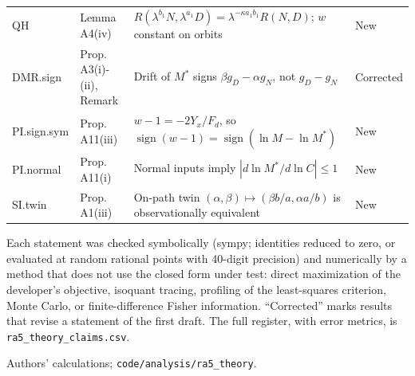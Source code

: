 \begin{table}[tp]
\begin{tabular}{@{}l >{\raggedright\arraybackslash}p{} >{\raggedright\arraybackslash}p{} l@{}}
QH & Lemma A4(iv) & $R(\lambda^{b_1}N,\lambda^{a_1}D)=\lambda^{-\kappa a_1b_1}R(N,D)$; $w$ constant on orbits & New \\
DMR.sign & Prop. A3(i)-(ii), Remark & Drift of $M^*$ signs $\beta g_D-\alpha g_N$, not $g_D-g_N$ & Corrected \\
PI.sign.sym & Prop. A11(iii) & $w-1=-2Y_x/F_d$, so $\operatorname{sign}(w-1)=\operatorname{sign}(\ln M-\ln M^*)$ & New \\
PI.normal & Prop. A11(i) & Normal inputs imply $|d\ln M^*/d\ln C|\le1$ & New \\
SI.twin & Prop. A1(iii) & On-path twin $(\alpha,\beta)\mapsto(\beta b/a,\alpha a/b)$ is observationally equivalent & New \\
\bottomrule
\end{tabular}
\par\smallskip
\begin{tablenotes}Each statement was checked symbolically (sympy; identities reduced to zero, or evaluated at random rational points with 40-digit precision) and numerically by a method that does not use the closed form under test: direct maximization of the developer's objective, isoquant tracing, profiling of the least-squares criterion, Monte Carlo, or finite-difference Fisher information. ``Corrected'' marks results that revise a statement of the first draft. The full register, with error metrics, is \texttt{ra5\_theory\_claims.csv}.\end{tablenotes}
\begin{tablenotes}[Source]Authors' calculations; \texttt{code/analysis/ra5\_theory}.\end{tablenotes}
\end{table}


